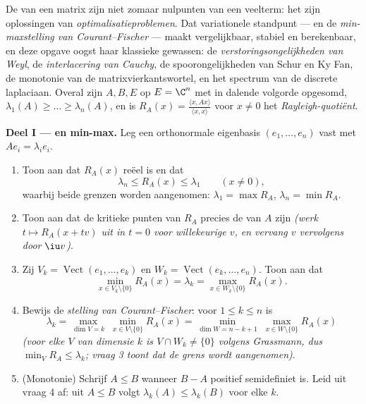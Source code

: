 \begin{problem}\label{pb:b2:hermitian:1}
De  van een  matrix zijn niet zomaar
nulpunten van een veelterm: het zijn oplossingen van
\emph{optimalisatieproblemen}. Dat variationele standpunt ---
 en de \emph{min-maxstelling van
Courant--Fischer} --- maakt
 vergelijkbaar, stabiel en berekenbaar, en deze opgave
oogst haar klassieke gewassen: de \emph{verstoringsongelijkheden
van Weyl}, de \emph{interlacering van
Cauchy}, de spoorongelijkheden van Schur en Ky Fan, de
monotonie van de matrixvierkantswortel, en het spectrum van de
discrete laplaciaan. Overal zijn $A, B, E$  op $E =
\C^n$ met  in dalende volgorde opgesomd, $\lambda_1(A)
\geq \dots \geq \lambda_n(A)$, en is $R_A(x) = \frac{\langle x,
Ax\rangle}{\langle x, x\rangle}$ voor $x \neq 0$ het
\emph{Rayleigh-quotiënt}.

\medskip
\noindent\textbf{Deel I ---  en min-max.} Leg
een orthonormale eigenbasis $(e_1, \dots, e_n)$ vast met $Ae_i =
\lambda_ie_i$.
\begin{enumerate}
  \item Toon aan dat $R_A(x)$ reëel is en dat
        \[
        \lambda_n \leq R_A(x) \leq \lambda_1
        \qquad (x \neq 0),
        \]
        waarbij beide grenzen worden aangenomen: $\lambda_1 =
        \max R_A$, $\lambda_n = \min R_A$.
  \item Toon aan dat de kritieke punten van $R_A$ precies de
         van $A$ zijn \emph{(werk $t \mapsto R_A(x +
        tv)$ uit in $t = 0$ voor willekeurige $v$, en vervang $v$
        vervolgens door $\iu v$)}.
  \item Zij $V_k = \operatorname{Vect}(e_1, \dots, e_k)$ en $W_k =
        \operatorname{Vect}(e_k, \dots, e_n)$. Toon aan dat
        \[
        \min_{x \in V_k\setminus\{0\}} R_A(x) = \lambda_k
        = \max_{x \in W_k\setminus\{0\}} R_A(x) .
        \]
  \item Bewijs de \emph{stelling van Courant--Fischer}: voor $1
        \leq k \leq n$ is
        \[
        \lambda_k = \max_{\dim V = k}\;\min_{x \in
        V\setminus\{0\}} R_A(x)
        = \min_{\dim W = n-k+1}\;\max_{x \in
        W\setminus\{0\}} R_A(x)
        \]
        \emph{(voor elke $V$ van dimensie $k$ is $V \cap W_k \neq
        \{0\}$ volgens Grassmann, dus $\min_V R_A \leq
        \lambda_k$; vraag 3 toont dat de grens wordt
        aangenomen)}.
  \item (Monotonie) Schrijf $A \leq B$ wanneer $B - A$ positief
        semidefiniet is. Leid uit vraag 4 af: uit $A \leq B$
        volgt $\lambda_k(A) \leq \lambda_k(B)$ voor elke $k$.
\end{enumerate}


\end{problem}
